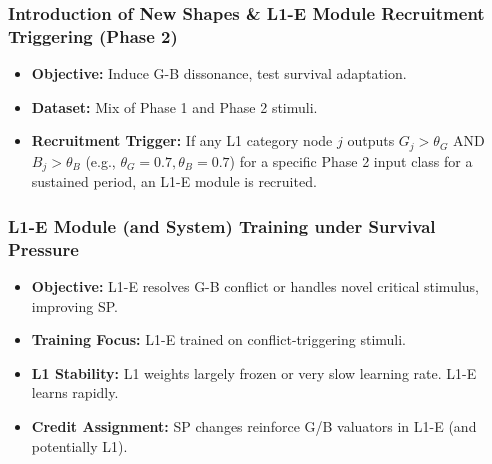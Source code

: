 \documentclass{article}
\begin{document}
\subsubsection{Introduction of New Shapes \& L1-E Module Recruitment Triggering (Phase 2)}
\begin{itemize}
    \item \textbf{Objective:} Induce G-B dissonance, test survival adaptation.
    \item \textbf{Dataset:} Mix of Phase 1 and Phase 2 stimuli.
    \item \textbf{Recruitment Trigger:} If any L1 category node $j$ outputs $G_j > \theta_G$ AND $B_j > \theta_B$ (e.g., $\theta_G=0.7, \theta_B=0.7$) for a specific Phase 2 input class for a sustained period, an L1-E module is recruited.
\end{itemize}

\subsubsection{L1-E Module (and System) Training under Survival Pressure}
\begin{itemize}
    \item \textbf{Objective:} L1-E resolves G-B conflict or handles novel critical stimulus, improving SP.
    \item \textbf{Training Focus:} L1-E trained on conflict-triggering stimuli.
    \item \textbf{L1 Stability:} L1 weights largely frozen or very slow learning rate. L1-E learns rapidly.
    \item \textbf{Credit Assignment:} SP changes reinforce G/B valuators in L1-E (and potentially L1).
\end{itemize}
\end{document}
